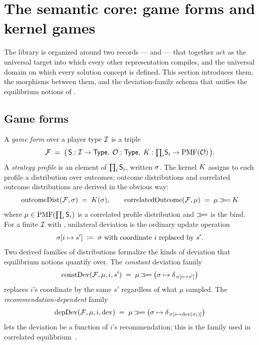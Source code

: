 \section{The semantic core: game forms and kernel games}
\label{sec:semantic-core}

The library is organized around two records —  and
 — that together act as the universal target into
which every other representation compiles, and the universal
domain on which every solution concept is defined.  This section
introduces them, the morphisms between them, and the
deviation-family schema that unifies the equilibrium notions of
.

\subsection{Game forms}
\label{sec:semantic-core:gameform}

A \emph{game form} over a player type $\mathcal{I}$ is a triple
\begin{equation}
\label{eq:gameform}
  \mathcal{F} \;=\; \bigl(\,\mathsf{S} : \mathcal{I} \to \mathsf{Type},\;
                    \mathcal{O} : \mathsf{Type},\;
                    K : {\textstyle\prod_i}\mathsf{S}_i \to \mathrm{PMF}(\mathcal{O})\,\bigr).
\end{equation}
A \emph{strategy profile} is an element of $\prod_i \mathsf{S}_i$,
written $\sigma$.  The kernel $K$ assigns to each profile a
distribution over outcomes; outcome distributions and correlated
outcome distributions are derived in the obvious way:
\[
  \mathrm{outcomeDist}(\mathcal{F}, \sigma) \;=\; K(\sigma),
  \qquad
  \mathrm{correlatedOutcome}(\mathcal{F}, \mu) \;=\; \mu \mathbin{\mathbin{\gg\!=}} K
\]
where $\mu \in \mathrm{PMF}(\prod_i \mathsf{S}_i)$ is a correlated profile
distribution and $\mathbin{\gg\!=}$ is the  bind.  For a finite
$\mathcal{I}$ with , unilateral deviation is the
ordinary update operation
\[
  \sigma[i \mapsto s'] \;\coloneqq\;
    \sigma \text{ with coordinate } i \text{ replaced by } s'.
\]
Two derived families of distributions formalize the kinds of
deviation that equilibrium notions quantify over.  The
\emph{constant} deviation family
\[
  \mathrm{constDev}(\mathcal{F}, \mu, i, s') \;=\;
    \mu \mathbin{\mathbin{\gg\!=}} \bigl(\sigma \mapsto \delta_{\,\sigma[i \mapsto s']}\bigr)
\]
replaces $i$'s coordinate by the same $s'$ regardless of what $\mu$
sampled.  The \emph{recommendation-dependent} family
\[
  \mathrm{depDev}(\mathcal{F}, \mu, i, \mathrm{dev}) \;=\;
    \mu \mathbin{\mathbin{\gg\!=}} \bigl(\sigma \mapsto
      \delta_{\,\sigma[i \mapsto \mathrm{dev}(\sigma_i)]}\bigr)
\]
lets the deviation be a function of $i$'s recommendation; this is
the family used in correlated equilibrium~\citep{Aumann1974}.

